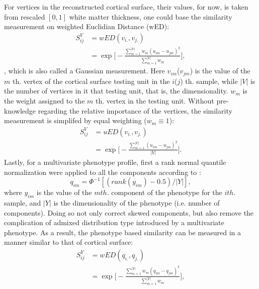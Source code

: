 For vertices in the reconstructed cortical surface, their values, for now, is taken from  rescaled $[0,1]$ white matter thickness, one could base the similarity measurement on weighted Euclidian Distance (wED):
\begin{equation} \label{eq:wSV}
\begin{split}
  S_{ij}^V &= wED(v_{i.},v_{j.}) \\
  &= \exp
  {
    \Big[-\frac{\sum_{m=1}^{|V|}{w_m(u_{im}-u_{jm})^2}} {\sum_{m=1}^{|V|}{w_m}}\Big]
  },
\end{split}
\end{equation}
, which is also called a Gaussian measurement. Here $v_{im}$($v_{jm}$) is the value of the $m$ th. vertex of the cortical surface testing unit in the $i$($j$) th. sample, while $|V|$ is the number of vertices in it that testing unit, that is, the dimensionality. $w_m$ is the weight assigned to the $m$ th. vertex in the testing unit. Without pre-knowledge regarding the relative importance of the vertices, the similarity measurement is simplifed by equal weighting ($w_m \equiv 1$):
\begin{equation*} \label{eq_uSV}
\begin{split}
  S_{ij}^V &= uED(v_{i.},v_{j.}) \\
  &= \exp
  {
    \Big[-\frac{\sum_{m=1}^{|V|}{(u_{im}-u_{jm})^2}} {|V|}\Big]
  }.
\end{split}
\end{equation*}
Lastly, for a multivariate phenotype profile, first a rank normal quantile normalization were applied to all the components according to \cite{HWU}:
\begin{displaymath}
  q_{im}=\Phi^{-1}[(rank(y_{im})-0.5)/|Y|],
\end{displaymath} 
where $y_{im}$ is the value of the $m th.$ component of the phenotype for the $i th.$ sample, and $|Y|$ is the dimensionality of the phenotype (i.e. number of components). Doing so not only correct skewed components, but also remove the complication of admixed distribution type introduced by a multivariate phenotype. As a result, the phenotype based similarity can be measured in a manner similar to that of cortical surface:
\begin{equation} \label{eq_wSY}
\begin{split}
  S_{ij}^Y &= wED(q_{i.},q_{j.}) \\
  &=\exp
  {
    \Big[-\frac{\sum_{m=1}^{|Y|}{w_m(q_{im}-q_{jm})^2}} {\sum_{m=1}^{|Y|}{w_m}}\Big]
  },
\end{split}
\end{equation}
